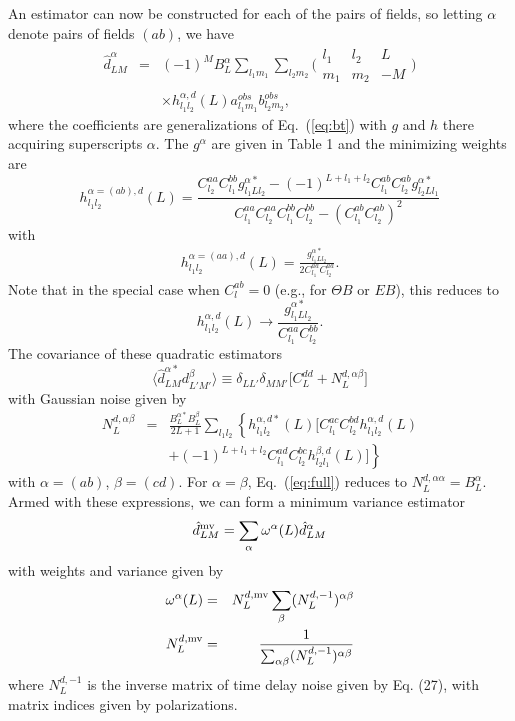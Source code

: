 \documentclass[prd,amsmath,amssymb,floatfix,superscriptaddress,nofootinbib,twocolumn]{revtex4-1}
\def\be{\begin{equation}}
\def\ee{\end{equation}}
\def\bea{\begin{eqnarray}}
\def\eea{\end{eqnarray}}
\newcommand{\ec}[1]{Eq.~(\ref{eq:#1})}
\newcommand{\eql}[1]{\label{eq:#1}}
\begin{document}
An estimator can now be constructed for each of the pairs of fields, so letting $\alpha$ denote pairs of fields $(ab)$, we have
\bea
\hat{d}^{\alpha}_{LM} &=&\nonumber  (-1)^{M} B_{L}^{\alpha}\sum_{l_{1}m_{1}}\sum_{l_{2}m_{2}}\bigl(\begin{smallmatrix} l_1 & l_2 & L \\ m_1 & m_2 & -M  \end{smallmatrix}\bigr) \\
&& \times h^{\alpha,d}_{l_{1}l_{2}}(L) a^{obs}_{l_{1}m_{1}}b^{obs}_{l_{2}m_{2}} ,
\eea
where the coefficients are generalizations of \ec{bt} with $g$ and $h$ there acquiring superscripts $\alpha$. The $g^\alpha$ are given in Table 1 and the minimizing weights are
\be
h^{\alpha=(ab),d}_{l_{1}l_{2}}(L) 
= \frac{C_{l_{2}}^{aa}C_{l_{1}}^{bb}g^{\alpha*}_{l_{1}Ll_{2}}-(-1)^{L+l_{1}+l_{2}}C_{l_{1}}^{ab}C_{l_{2}}^{ab}g^{\alpha*}_{l_{2}Ll_{1}}}{C_{l_{1}}^{aa}C_{l_{2}}^{aa}C_{l_{1}}^{bb}C_{l_{2}}^{bb}-(C_{l_{1}}^{ab}C_{l_{2}}^{ab})^{2}}
\ee
with 
\bea 
h_{l_{1}l_{2}}^{\alpha=(aa),d}(L)= \frac{g_{l_{1}Ll_{2}}^{\alpha*}}{2C_{l_{1}}^{aa}C_{l_{2}}^{aa}}.
\eea 
Note that in the special case when $C_{l}^{ab}=0$ (e.g., for $\Theta B$ or $EB$), this reduces to 
\be
h^{\alpha,d}_{l_{1}l_{2}}(L) \rightarrow \frac{g^{\alpha *}_{l_{1}Ll_{2}}}{C_{l_{1}}^{aa}C_{l_{2}}^{bb}}. 
\ee
The covariance of these quadratic estimators
\be
\langle \hat{d}^{\alpha*}_{LM}d^{\beta}_{L'M'}\rangle \equiv \delta_{LL'}\delta_{MM'}\big[ C_{L}^{dd}+N_{L}^{d,\alpha \beta} \big]
\ee
with Gaussian noise given by
\bea
N_{L}^{d,\alpha\beta}&=&\frac{B_{L}^{\alpha*}B_{L}^{\beta}}{2L+1}\sum_{l_{1}l_{2}}  \left\{ h_{l_{1}l_{2}}^{\alpha,d*} (L)\big[ C_{l_{1}}^{ac}C_{l_{2}}^{bd}h_{l_{1}l_{2}}^{\alpha,d}(L)\right. \nonumber \\
&&\left. +(-1)^{L+l_{1}+l_{2}}C_{l_{1}}^{ad}C_{l_{2}}^{bc} h_{l_{2}l_{1}}^{\beta,d}(L)  \big]\right\}\eql{full}
\eea
with $\alpha=(ab)$, $\beta=(cd)$. For $\alpha=\beta$, \ec{full} reduces to $N_{L}^{d,\alpha\alpha}=B_{L}^{\alpha}$.
Armed with these expressions, we can form a minimum variance estimator
\be
\hat{d}^{\rm mv}_{LM} = \sum_{\alpha}\omega^{\alpha}(L)\hat{d}^{\alpha}_{LM}
\ee
with weights and variance given by
\bea
\omega^{\alpha}(L) & =&N^{d,\rm mv}_{L} \sum_{\beta}(N_{L}^{d,-1})^{\alpha \beta} \\
N^{d,\rm mv}_{L} &=& \frac{1}{\sum_{\alpha\beta} (N_{L}^{d,-1})^{\alpha \beta}}
\eea
where $N_{L}^{d,-1}$ is the inverse matrix of time delay noise given by Eq. (27), with matrix indices given by polarizations. 
\end{document}
